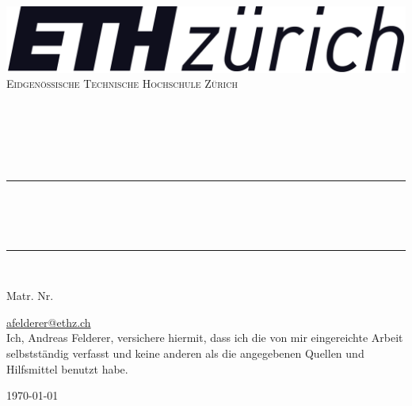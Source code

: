 \begin{titlepage}
	\centering
    \vspace*{0.4 cm}
    \includegraphics[scale = 0.15]{figures/ETHZ_logo_black.png}\\[1.0 cm]	%
    \textsc{\LARGE Eidgenössische Technische Hochschule Zürich}\\[2.0 cm]
	
	\textsc{\Large \docLectureNumber}\\[0.5 cm]	%
	\textsc{\Large \docTypeofWork}\\[0.5 cm] 
	\textsc{\Large \bfseries\sffamily \docLectureTitle}\\[0.5 cm]	%
	{\large \docTeacher}\\[0.5cm]
	\textsc{\large \docTerm }\\[0.5 cm]
	\rule{\linewidth}{0.2 mm} \\[0.4 cm]

	{\huge\bfseries\sffamily \docTitle}\\[0.5 cm]
	{\Large\sffamily \docSubTitle}\\
	\rule{\linewidth}{0.2 mm} \\[0.4 cm]
	
	{\Large\itshape \docAuthor \par}
	Matr. Nr. \docMatNr \par
	\href{mailto:afelderer@ethz.ch}{afelderer@ethz.ch} \\[2 cm]

	
	Ich, Andreas Felderer, versichere hiermit, dass ich die von mir eingereichte Arbeit selbstständig verfasst und keine
anderen als die angegebenen Quellen und Hilfsmittel benutzt habe.

	\vfill


	{\large \today \par}
\end{titlepage}